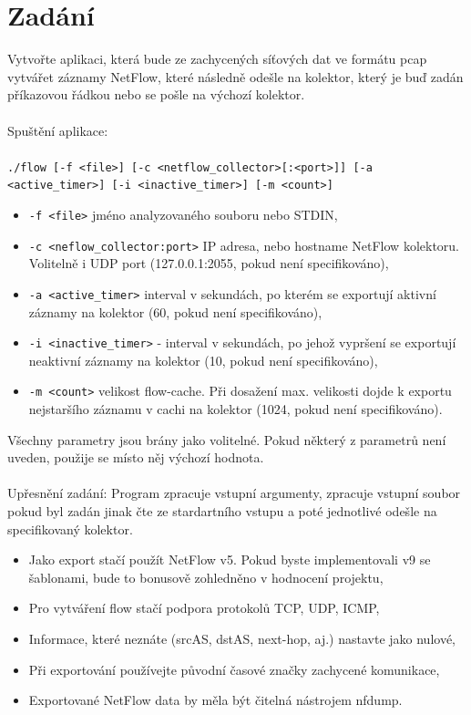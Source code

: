 \documentclass[12pt]{article}
\begin{document}
\section*{Zadání}
Vytvořte aplikaci, která bude ze zachycených síťových dat ve formátu pcap vytvářet záznamy NetFlow, které následně odešle na kolektor, který je buď zadán příkazovou řádkou nebo se pošle na výchozí kolektor.
\\\\
Spuštění aplikace:\\ 
\\\texttt{./flow [-f <file>] [-c <netflow\_collector>[:<port>]] [-a <active\_timer>] [-i <inactive\_timer>] [-m <count>]}
\begin{itemize}
    \item {\texttt{-f <file>} jméno analyzovaného souboru nebo STDIN,}
    \item {\texttt{-c <neflow\_collector:port>} IP adresa, nebo hostname NetFlow kolektoru. Volitelně i UDP port (127.0.0.1:2055, pokud není specifikováno),}
    \item {\texttt{-a <active\_timer>} interval v sekundách, po kterém se exportují aktivní záznamy na kolektor (60, pokud není specifikováno),}
    \item {\texttt{-i <inactive\_timer>} - interval v sekundách, po jehož vypršení se exportují neaktivní záznamy na kolektor (10, pokud není specifikováno),}
    \item {\texttt{-m <count>} velikost flow-cache. Při dosažení max. velikosti dojde k exportu nejstaršího záznamu v cachi na kolektor (1024, pokud není specifikováno).\\}
\end{itemize}
Všechny parametry jsou brány jako volitelné. Pokud některý z parametrů není uveden, použije se místo něj výchozí hodnota.
\\\\
Upřesnění zadání: Program zpracuje vstupní argumenty, zpracuje vstupní soubor pokud byl zadán jinak čte ze stardartního vstupu a poté jednotlivé  odešle na specifikovaný kolektor. 
\\
\begin{itemize}
        \item {Jako export stačí použít NetFlow v5. Pokud byste implementovali v9 se šablonami, bude to bonusově zohledněno v hodnocení projektu,}
        \item {Pro vytváření flow stačí podpora protokolů TCP, UDP, ICMP,}
        \item {Informace, které neznáte (srcAS, dstAS, next-hop, aj.) nastavte jako nulové,}
        \item {Při exportování používejte původní časové značky zachycené komunikace,}
        \item {Exportované NetFlow data by měla být čitelná nástrojem nfdump.}
\end{itemize}
\pagebreak
\end{document}
